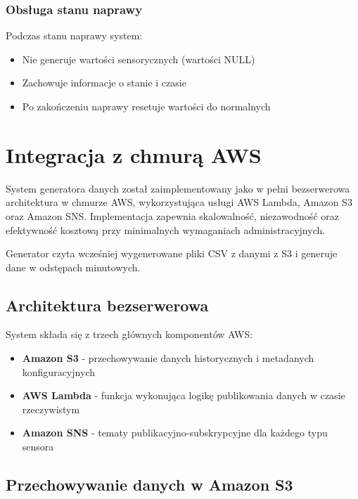 \subsubsection{Obsługa stanu naprawy}

Podczas stanu naprawy system:
\begin{itemize}
    \item Nie generuje wartości sensorycznych (wartości NULL)
    \item Zachowuje informacje o stanie i czasie
    \item Po zakończeniu naprawy resetuje wartości do normalnych
\end{itemize}

\section{Integracja z chmurą AWS}
\label{sec:integracja_aws}

System generatora danych został zaimplementowany jako w pełni bezserwerowa architektura w chmurze AWS, wykorzystująca usługi AWS Lambda, Amazon S3 oraz Amazon SNS. Implementacja zapewnia skalowalność, niezawodność oraz efektywność kosztową przy minimalnych wymaganiach administracyjnych.

Generator czyta wcześniej wygenerowane pliki CSV z danymi z S3 i generuje dane w odstępach minutowych.

\subsection{Architektura bezserwerowa}
\label{subsec:architektura_bezserwerowa}

System składa się z trzech głównych komponentów AWS:

\begin{itemize}
    \item \textbf{Amazon S3} - przechowywanie danych historycznych i metadanych konfiguracyjnych
    \item \textbf{AWS Lambda} - funkcja wykonująca logikę publikowania danych w czasie rzeczywistym
    \item \textbf{Amazon SNS} - tematy publikacyjno-subskrypcyjne dla każdego typu sensora
\end{itemize}

\subsection{Przechowywanie danych w Amazon S3}
\label{subsec:amazon_s3}

